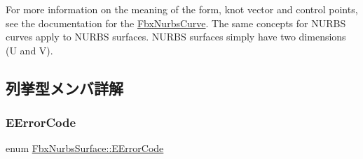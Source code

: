 For more information on the meaning of the form, knot vector and control points, see the documentation for the \hyperlink{class_fbx_nurbs_curve}{Fbx\+Nurbs\+Curve}. The same concepts for N\+U\+R\+BS curves apply to N\+U\+R\+BS surfaces. N\+U\+R\+BS surfaces simply have two dimensions (U and V). 

\subsection{列挙型メンバ詳解}
\mbox{\label{class_fbx_nurbs_surface_adadf65d5c2d4ecb11d0d084c7312106a}} 
\subsubsection{\texorpdfstring{E\+Error\+Code}{EErrorCode}}
{\footnotesize\ttfamily enum \hyperlink{class_fbx_nurbs_surface_adadf65d5c2d4ecb11d0d084c7312106a}{Fbx\+Nurbs\+Surface\+::\+E\+Error\+Code}}

